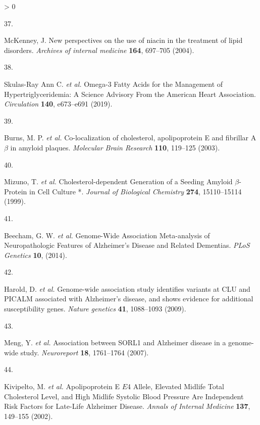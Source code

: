 \documentclass[a4paper, twoside]{templates/ociamthesis}
\newlength{\cslhangindent}
\newlength{\csllabelwidth}
\newenvironment{CSLReferences}[3] %
 {%
  \setlength{\parindent}{0pt}
  \ifodd #1 \everypar{\setlength{\hangindent}{\cslhangindent}}\ignorespaces\fi
  \ifnum #2 > 0
  \setlength{\parskip}{#2\baselineskip}
  \fi
 }%
 {}
\newcommand{\CSLLeftMargin}[1]{\parbox[t]{\maxof{\widthof{#1}}{\csllabelwidth}}{#1}}
\newcommand{\CSLRightInline}[1]{\parbox[t]{\linewidth - \csllabelwidth}{#1}}
\begin{document}
\begin{CSLReferences}{0}{0}
\leavevmode\hypertarget{ref-mckenney2004new}{}%
\CSLLeftMargin{37. }
\CSLRightInline{McKenney, J. New perspectives on the use of niacin in the treatment of lipid disorders. \emph{Archives of internal medicine} \textbf{164}, 697--705 (2004).}

\leavevmode\hypertarget{ref-skulas-rayannc.2019}{}%
\CSLLeftMargin{38. }
\CSLRightInline{Skulas-Ray Ann C. \emph{et al.} Omega-3 {Fatty Acids} for the {Management} of {Hypertriglyceridemia}: A {Science Advisory From} the {American Heart Association}. \emph{Circulation} \textbf{140}, e673--e691 (2019).}

\leavevmode\hypertarget{ref-burns2003}{}%
\CSLLeftMargin{39. }
\CSLRightInline{Burns, M. P. \emph{et al.} Co-localization of cholesterol, apolipoprotein {E} and fibrillar {A\(\beta\)} in amyloid plaques. \emph{Molecular Brain Research} \textbf{110}, 119--125 (2003).}

\leavevmode\hypertarget{ref-mizuno1999}{}%
\CSLLeftMargin{40. }
\CSLRightInline{Mizuno, T. \emph{et al.} Cholesterol-dependent {Generation} of a {Seeding Amyloid} {\(\beta\)}-{Protein} in {Cell Culture} *. \emph{Journal of Biological Chemistry} \textbf{274}, 15110--15114 (1999).}

\leavevmode\hypertarget{ref-beecham2014}{}%
\CSLLeftMargin{41. }
\CSLRightInline{Beecham, G. W. \emph{et al.} Genome-{Wide Association Meta}-analysis of {Neuropathologic Features} of {Alzheimer}'s {Disease} and {Related Dementias}. \emph{PLoS Genetics} \textbf{10}, (2014).}

\leavevmode\hypertarget{ref-harold2009}{}%
\CSLLeftMargin{42. }
\CSLRightInline{Harold, D. \emph{et al.} Genome-wide association study identifies variants at {CLU} and {PICALM} associated with {Alzheimer}'s disease, and shows evidence for additional susceptibility genes. \emph{Nature genetics} \textbf{41}, 1088--1093 (2009).}

\leavevmode\hypertarget{ref-meng2007}{}%
\CSLLeftMargin{43. }
\CSLRightInline{Meng, Y. \emph{et al.} Association between {SORL1} and {Alzheimer} disease in a genome-wide study. \emph{Neuroreport} \textbf{18}, 1761--1764 (2007).}

\leavevmode\hypertarget{ref-kivipelto2002}{}%
\CSLLeftMargin{44. }
\CSLRightInline{Kivipelto, M. \emph{et al.} Apolipoprotein {E} {\(E\)}4 {Allele}, {Elevated Midlife Total Cholesterol Level}, and {High Midlife Systolic Blood Pressure Are Independent Risk Factors} for {Late}-{Life Alzheimer Disease}. \emph{Annals of Internal Medicine} \textbf{137}, 149--155 (2002).}


\end{CSLReferences}
\end{document}
